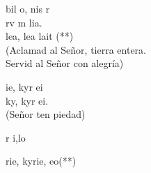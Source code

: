 \documentclass[12pt]{article}
\begin{document}
\begin{multicols*}{2}
\begin{cancion}%
	bil o, nis r\\
	rv m  lia.\\
\jump
	lea, lea  lait (**)\\
(Aclamad al Señor, tierra entera.\\
 Servid al Señor con alegría)\\
\end{cancion}%

\begin{cancion}%
	ie, kyr ei\\
	ky, kyr ei.\\
(Señor ten piedad)\\
\end{cancion}%

\begin{cancion}%
	r i,lo\\
\end{cancion}%

\begin{cancion}%
	rie, kyrie, eo(**)\\
\end{cancion}%


\end{multicols*}
\end{document}
